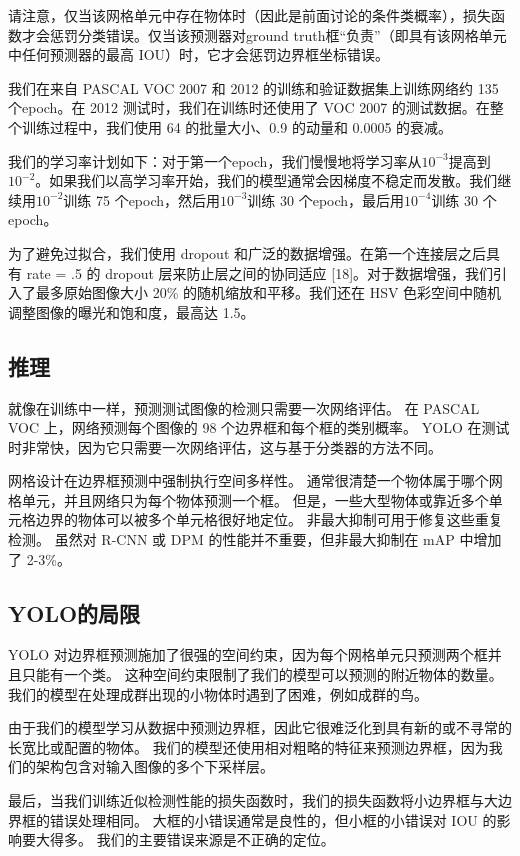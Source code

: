 \documentclass[../main.tex]{subfile}
\begin{document}
请注意，仅当该网格单元中存在物体时（因此是前面讨论的条件类概率），损失函数才会惩罚分类错误。仅当该预测器对ground truth框“负​​责”（即具有该网格单元中任何预测器的最高 IOU）时，它才会惩罚边界框坐标错误。

我们在来自 PASCAL VOC 2007 和 2012 的训练和验证数据集上训练网络约 135 个epoch。在 2012 测试时，我们在训练时还使用了 VOC 2007 的测试数据。在整个训练过程中，我们使用 64 的批量大小、0.9 的动量和 0.0005 的衰减。

我们的学习率计划如下：对于第一个epoch，我们慢慢地将学习率从$10^{-3} $提高到$ 10^{-2}$。如果我们以高学习率开始，我们的模型通常会因梯度不稳定而发散。我们继续用$ 10^{-2} $训练 75 个epoch，然后用$ 10^{-3} $训练 30 个epoch，最后用$ 10^{-4} $训练 30 个epoch。

为了避免过拟合，我们使用 dropout 和广泛的数据增强。在第一个连接层之后具有 rate = .5 的 dropout 层来防止层之间的协同适应 [18]。对于数据增强，我们引入了最多原始图像大小 20\% 的随机缩放和平移。我们还在 HSV 色彩空间中随机调整图像的曝光和饱和度，最高达 1.5。

\subsection{推理}

就像在训练中一样，预测测试图像的检测只需要一次网络评估。 在 PASCAL VOC 上，网络预测每个图像的 98 个边界框和每个框的类别概率。 YOLO 在测试时非常快，因为它只需要一次网络评估，这与基于分类器的方法不同。

网格设计在边界框预测中强制执行空间多样性。 通常很清楚一个物体属于哪个网格单元，并且网络只为每个物体预测一个框。 但是，一些大型物体或靠近多个单元格边界的物体可以被多个单元格很好地定位。 非最大抑制可用于修复这些重复检测。 虽然对 R-CNN 或 DPM 的性能并不重要，但非最大抑制在 mAP 中增加了 2-3\%。

\subsection{YOLO的局限}

YOLO 对边界框预测施加了很强的空间约束，因为每个网格单元只预测两个框并且只能有一个类。 这种空间约束限制了我们的模型可以预测的附近物体的数量。 我们的模型在处理成群出现的小物体时遇到了困难，例如成群的鸟。

由于我们的模型学习从数据中预测边界框，因此它很难泛化到具有新的或不寻常的长宽比或配置的物体。 我们的模型还使用相对粗略的特征来预测边界框，因为我们的架构包含对输入图像的多个下采样层。

最后，当我们训练近似检测性能的损失函数时，我们的损失函数将小边界框与大边界框的错误处理相同。 大框的小错误通常是良性的，但小框的小错误对 IOU 的影响要大得多。 我们的主要错误来源是不正确的定位。
\end{document}
